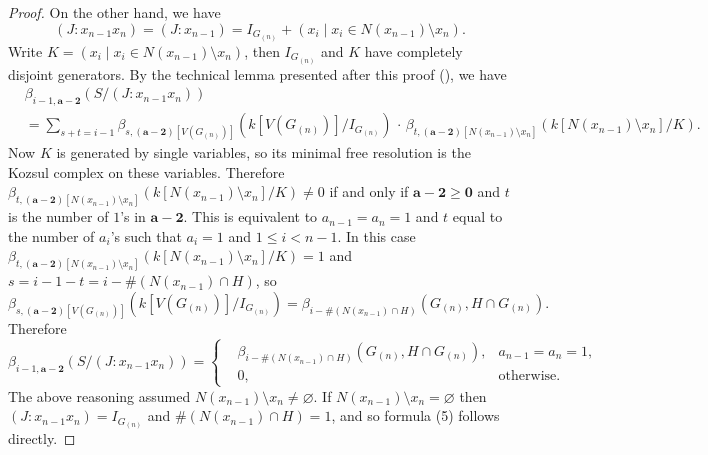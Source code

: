 \documentclass[dvipsnames,10pt]{article}
\begin{document}
\begin{proof}
    On the other hand, we have
    \begin{equation*}
        (J:x_{n-1}x_n) = (J:x_{n-1}) = I_{G_{(n)}} + (x_i\mid x_i\in N(x_{n-1})\setminus x_n).
    \end{equation*}
    Write $K=(x_i\mid x_i\in N(x_{n-1})\setminus x_n)$, then $I_{G_{(n)}}$ and $K$ have completely disjoint generators. By the technical lemma presented after this proof (), we have
    \begin{align*}
        &\beta_{i-1,\mathbf{a}-\mathbf{2}}(S/(J:x_{n-1}x_n)) \\
        &= \sum_{s+t=i-1}\beta_{s,(\mathbf{a}-\mathbf{2})[V(G_{(n)})]}(k[V(G_{(n)})]/I_{G_{(n)}})\,\cdot\,\beta_{t,(\mathbf{a}-\mathbf{2})[N(x_{n-1})\setminus x_n]}(k[N(x_{n-1})\setminus x_n]/K).
    \end{align*}
    Now $K$ is generated by single variables, so its minimal free resolution is the Kozsul complex on these variables. Therefore $\beta_{t,(\mathbf{a}-\mathbf{2})[N(x_{n-1})\setminus x_n]}(k[N(x_{n-1})\setminus x_n]/K)\neq 0$ if and only if $\mathbf{a}-\mathbf{2}\geqslant \mathbf{0}$ and $t$ is the number of $1$'s in $\mathbf{a}-\mathbf{2}$. This is equivalent to $a_{n-1}=a_n=1$ and $t$ equal to the number of $a_i$'s such that $a_i=1$ and $1\leqslant i<n-1$. In this case $\beta_{t,(\mathbf{a}-\mathbf{2})[N(x_{n-1})\setminus x_n]}(k[N(x_{n-1})\setminus x_n]/K)=1$ and $s=i-1-t=i-\#(N(x_{n-1})\cap H)$, so
    \begin{equation*}
        \beta_{s,(\mathbf{a}-\mathbf{2})[V(G_{(n)})]}(k[V(G_{(n)})]/I_{G_{(n)}}) = \beta_{i-\#(N(x_{n-1})\cap H)}(G_{(n)},H\cap G_{(n)}).
    \end{equation*}
    Therefore
    \begin{equation}
        \beta_{i-1,\mathbf{a}-\mathbf{2}}(S/(J:x_{n-1}x_n)) = \left\{
            \begin{aligned}
                &\beta_{i-\#(N(x_{n-1})\cap H)}(G_{(n)},H\cap G_{(n)}), &a_{n-1}=a_n=1,\\
                &0, &\mathrm{otherwise}.
            \end{aligned}
        \right.
    \end{equation}
    The above reasoning assumed $N(x_{n-1})\setminus x_n\neq\varnothing$. If $N(x_{n-1})\setminus x_n=\varnothing$ then $(J:x_{n-1}x_n)=I_{G_{(n)}}$ and $\#(N(x_{n-1})\cap H)=1$, and so formula (5) follows directly.


\end{proof}
\end{document}
